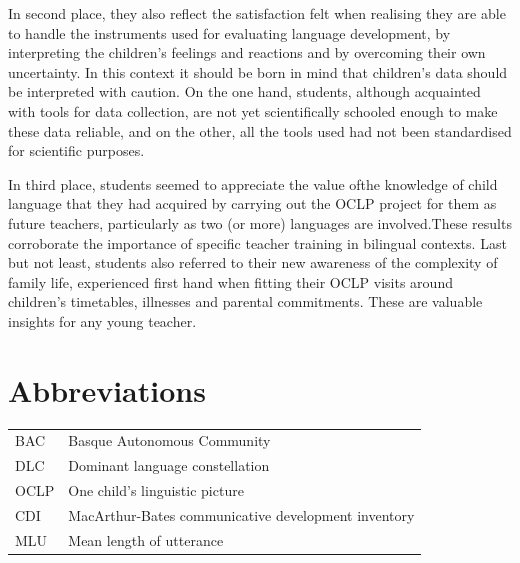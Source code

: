 \documentclass[output=paper]{../langscibook}
\begin{document}
In second place, they also reflect the satisfaction felt when realising they are able to handle the instruments used for evaluating language development, by interpreting the children’s feelings and reactions and by overcoming their own uncertainty. In this context it should be born in mind that children’s data should be interpreted with caution. On the one hand, students, although acquainted with tools for data collection, are not yet scientifically schooled enough to make these data reliable, and on the other, all the tools used had not been standardised for scientific purposes.

In third place, students seemed to appreciate the value ofthe knowledge of child language that they had acquired by carrying out the OCLP project for them as future teachers, particularly as two (or more) languages are involved.These results corroborate the importance of specific teacher training in bilingual contexts.  Last but not least, students also referred to their new awareness of the complexity of family life, experienced first hand when fitting their OCLP visits around children's timetables, illnesses and parental commitments. These are valuable insights for any young teacher.  


\section[*]{Abbreviations}
\label{sec:abbreviations}




\begin{tabular}{@{}ll}
BAC & Basque Autonomous Community\\
DLC & Dominant language constellation\\
OCLP & One child's linguistic picture\\
CDI & MacArthur-Bates communicative development inventory\\
MLU & Mean length of utterance\\
\end{tabular}



\sloppy\printbibliography[heading=subbibliography,notkeyword=this]
\end{document}
